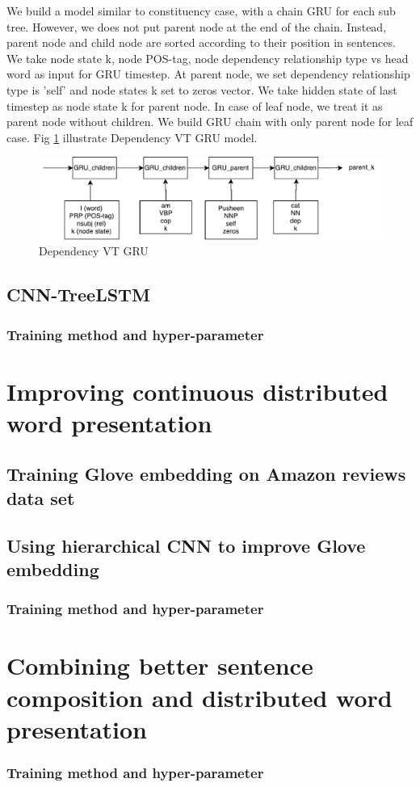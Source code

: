 We build a model similar to constituency case, with a chain GRU for each sub tree. However, we does not put parent node at the end of the chain. Instead, parent node and child node are sorted according to their position in sentences. We take node state k, node POS-tag, node dependency relationship type vs head word as input for GRU timestep. At parent node, we set dependency relationship type is 'self' and node states k set to zeros vector. We take hidden state of last timestep as node state k for parent node. In case of leaf node, we treat it as parent node without children. We build GRU chain with only parent node for leaf case. Fig \ref{fig:dependencyvtgru} illustrate Dependency VT GRU model.

\begin{figure}[h]
	\centering
	\includegraphics[width=0.5\linewidth]{figure/dependencyvtgru}
	\caption[Dependency VT GRU]{Dependency VT GRU}
	\label{fig:dependencyvtgru}
\end{figure}



\subsection{CNN-TreeLSTM}\label{sec:CNNtree}


\subsubsection{Training method and hyper-parameter}


\section{Improving continuous distributed word presentation}

\subsection{Training Glove embedding on Amazon reviews data set}

\subsection{Using hierarchical CNN to improve Glove embedding}

\subsubsection{Training method and hyper-parameter}


\section{Combining better sentence composition and distributed word presentation}

\subsubsection{Training method and hyper-parameter}
